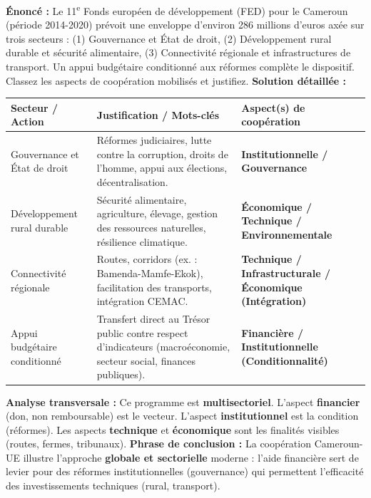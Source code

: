 \documentclass[11pt]{article}
\begin{document}
\begin{exoresolu}
\textbf{Énoncé :} Le 11\textsuperscript{e} Fonds européen de développement (FED) pour le Cameroun (période 2014-2020) prévoit une enveloppe d'environ 286 millions d'euros axée sur trois secteurs : (1) Gouvernance et État de droit, (2) Développement rural durable et sécurité alimentaire, (3) Connectivité régionale et infrastructures de transport. Un appui budgétaire conditionné aux réformes complète le dispositif. Classez les aspects de coopération mobilisés et justifiez.
\tcblower
\textbf{Solution détaillée :}
\begin{center}
\begin{tabularx}{\linewidth}{|l|X|l|}
\hline
\textbf{Secteur / Action} & \textbf{Justification / Mots-clés} & \textbf{Aspect(s) de coopération} \\
\hline
Gouvernance et État de droit & Réformes judiciaires, lutte contre la corruption, droits de l'homme, appui aux élections, décentralisation. & \textbf{Institutionnelle / Gouvernance} \\
\hline
Développement rural durable & Sécurité alimentaire, agriculture, élevage, gestion des ressources naturelles, résilience climatique. & \textbf{Économique / Technique / Environnementale} \\
\hline
Connectivité régionale & Routes, corridors (ex. : Bamenda-Mamfe-Ekok), facilitation des transports, intégration CEMAC. & \textbf{Technique / Infrastructurale / Économique (Intégration)} \\
\hline
Appui budgétaire conditionné & Transfert direct au Trésor public contre respect d'indicateurs (macroéconomie, secteur social, finances publiques). & \textbf{Financière / Institutionnelle (Conditionnalité)} \\
\hline
\end{tabularx}
\end{center}
\textbf{Analyse transversale :} Ce programme est \textbf{multisectoriel}. L'aspect \textbf{financier} (don, non remboursable) est le vecteur. L'aspect \textbf{institutionnel} est la condition (réformes). Les aspects \textbf{technique} et \textbf{économique} sont les finalités visibles (routes, fermes, tribunaux).
\textbf{Phrase de conclusion :} La coopération Cameroun-UE illustre l'approche \textbf{globale et sectorielle} moderne : l'aide financière sert de levier pour des réformes institutionnelles (gouvernance) qui permettent l'efficacité des investissements techniques (rural, transport).
\end{exoresolu}
\end{document}
